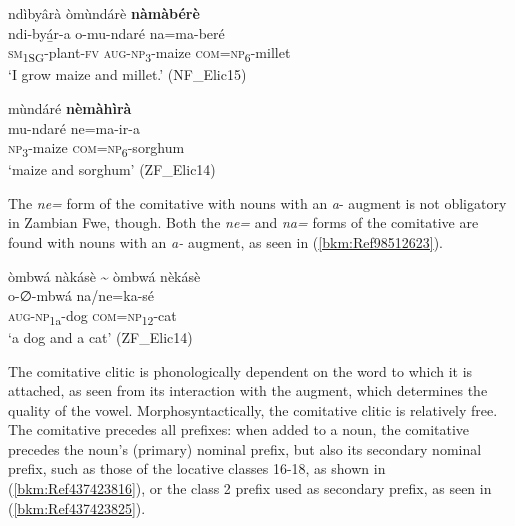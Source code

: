 \ea
\label{bkm:Ref436820039}
ndìbyârà òmùndárè \textbf{nàmàbérè}\\
\gll ndi-byá̲r-a    o-mu-ndaré    na=ma-beré\\
\textsc{sm}\textsubscript{1SG}-plant-\textsc{fv}  \textsc{aug}-\textsc{np}\textsubscript{3}-maize  \textsc{com}=\textsc{np}\textsubscript{6}-millet\\
\glt ‘I grow maize and millet.’ (NF\_Elic15)
\z

\ea
\label{bkm:Ref437511600}
mùndáré \textbf{nèmàhìrà}\\
\gll mu-ndaré  ne=ma-ir-a\\
\textsc{np}\textsubscript{3}-maize  \textsc{com}=\textsc{np}\textsubscript{6}-sorghum\\
\glt ‘maize and sorghum’ (ZF\_Elic14)
\z

The \textit{ne=} form of the comitative with nouns with an \textit{a}- augment is not obligatory in Zambian Fwe, though. Both the \textit{ne=} and \textit{na=} forms of the comitative are found with nouns with an \textit{a-} augment, as seen in (\ref{bkm:Ref98512623}).

\ea
\label{bkm:Ref98512623}
òmbwá nàkásè {\textasciitilde} òmbwá nèkásè\\
\gll o-∅-mbwá    na/ne=ka-sé\\
\textsc{aug}-\textsc{np}\textsubscript{1a}-dog  \textsc{com}=\textsc{np}\textsubscript{12}-cat\\
\glt ‘a dog and a cat’\footnotemark{} (ZF\_Elic14)
\z
{}

The comitative clitic is phonologically dependent on the word to which it is attached, as seen from its interaction with the augment, which determines the quality of the vowel. Morphosyntactically, the comitative clitic is relatively free. The comitative precedes all prefixes: when added to a noun, the comitative precedes the noun’s (primary) nominal prefix, but also its secondary nominal prefix, such as those of the locative classes 16-18, as shown in (\ref{bkm:Ref437423816}), or the class 2 prefix used as secondary prefix, as seen in (\ref{bkm:Ref437423825}).

